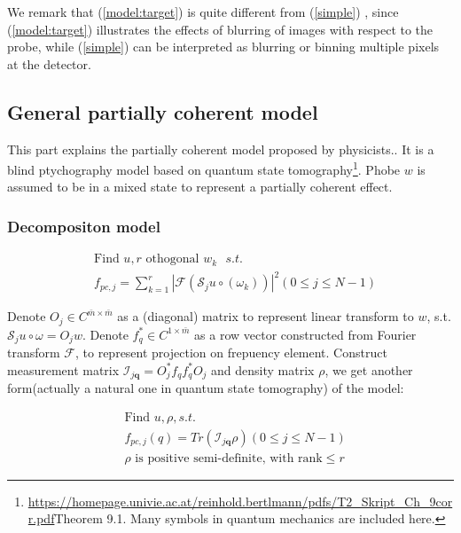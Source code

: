 \documentclass{article}
\numberwithin{equation}{section}
\begin{document}
We remark that (\ref{model:target}) is quite different from
 (\ref{simple}) , since (\ref{model:target}) illustrates the effects of blurring of images with respect to the probe, while (\ref{simple}) can be interpreted as blurring or binning multiple pixels at the detector.

\subsection{General partially coherent model}
This part explains the partially coherent model proposed by physicists.\cite{mix}.   It is a blind ptychography model based on quantum state tomography\footnote{\url{https://homepage.univie.ac.at/reinhold.bertlmann/pdfs/T2_Skript_Ch_9corr.pdf}Theorem 9.1. Many symbols in quantum mechanics are included here.}.  Phobe $w$ is assumed to be in a mixed state to represent a partially coherent effect.


\subsubsection{Decompositon model}

 
\begin{equation}
\label{sep} 
\begin{aligned}
&\mbox{Find } u, r \mbox{ othogonal $w_k$   }s.t. \\
&f_{p c, j}=\sum_{k=1}^r \left|\mathcal{F}\left( \mathcal{S}_{j} u \circ \left(\omega_k\right) \right)\right|^{2} (0\leq j \leq N-1)
\end{aligned}
\end{equation}

 


Denote $O_j \in C^{\bar{m} \times \bar{m}}$ as a (diagonal) matrix to represent linear transform to $w$, s.t. $\mathcal{S}_{j} u \circ \omega = O_j w$. Denote $f_q^* \in C^{1 \times \bar{m}}$ as a row vector  constructed from Fourier transform $\mathcal{F}$, to represent projection on frepuency element. Construct measurement matrix $ \mathcal{I}_{j \mathbf{q}} = O_j^*f_qf_q^*O_j$ and density matrix $\rho$, we get another form(actually a natural one in quantum state tomography) of the model:


\begin{equation}
\label{lift}
\begin{aligned}
&\mbox{Find } u,\rho,s.t.\\
&f_{pc,j}(q) = Tr(\mathcal{I}_{j \mathbf{q}} \rho ) (0\leq j \leq N-1)\\
&\rho \mbox{ is positive semi-definite, with rank}\leq r 
\end{aligned}
\end{equation}
\end{document}
